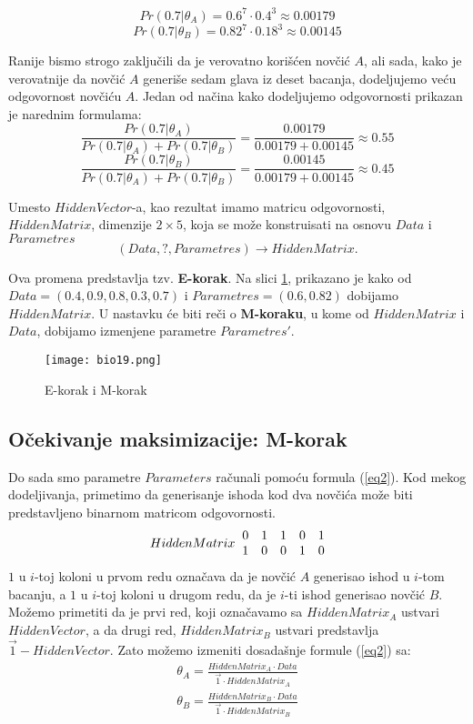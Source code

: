 $$Pr(0.7|\theta_A) = 0.6^7 \cdot 0.4^3 \approx 0.00179$$ 
$$Pr(0.7|\theta_B)= 0.82^7 \cdot 0.18^3 \approx 0.00145$$

Ranije bismo strogo zaključili da je verovatno korišćen novčić $A$, ali sada, kako je verovatnije da novčić $A$ generiše sedam glava iz deset bacanja, dodeljujemo veću odgovornost novčiću $A$. %
Jedan od načina kako dodeljujemo odgovornosti prikazan je narednim formulama:
$$\frac{Pr(0.7|\theta_A)}{Pr(0.7|\theta_A) + Pr(0.7|\theta_B)} = \frac{0.00179}{0.00179 + 0.00145} \approx 0.55 $$
$$\frac{Pr(0.7|\theta_B)}{Pr(0.7|\theta_A) + Pr(0.7|\theta_B)} = \frac{0.00145}{0.00179 + 0.00145} \approx 0.45 $$

Umesto $HiddenVector$-a, kao rezultat imamo matricu odgovornosti, $HiddenMatrix$, dimenzije $2 \times 5$, %
koja se može konstruisati na osnovu $Data$ i $Parametres$
$$(Data, ? ,Parametres) \rightarrow HiddenMatrix.$$

Ova promena predstavlja tzv. \textbf{E-korak}. Na slici \ref{slika 19}, prikazano je kako od $Data = (0.4, 0.9, 0.8, 0.3, 0.7)$ i $Parametres = (0.6, 0.82)$ dobijamo $HiddenMatrix$. U nastavku će biti reči o \textbf{M-koraku}, u kome od $HiddenMatrix$ i $Data$, dobijamo izmenjene parametre $Parametres'$.
\begin{figure}
    \centering
    \texttt{[image: bio19.png]}
    \caption{E-korak i M-korak}
    \label{slika 19}
\end{figure}

\subsection{Očekivanje maksimizacije: M-korak}

Do sada smo parametre $Parameters$ računali pomoću formula (\ref{eq2}). Kod mekog dodeljivanja, primetimo da generisanje ishoda kod dva novčića može biti predstavljeno binarnom matricom odgovornosti.
$$HiddenMatrix \hspace{0.2cm}
\begin{matrix}
0 & 1 & 1 & 0 & 1 \\
1 & 0 & 0 & 1 & 0
\end{matrix}
$$
$1$ u $i$-toj koloni u prvom redu označava da je novčić $A$ generisao ishod u $i$-tom bacanju, a $1$ u $i$-toj koloni u drugom redu, da je $i$-ti ishod generisao novčić $B$.
Možemo primetiti da je prvi red, koji označavamo sa $HiddenMatrix_A$ ustvari $HiddenVector$, a da drugi red, $HiddenMatrix_B$ ustvari predstavlja $\overrightarrow{1} - HiddenVector$. Zato možemo izmeniti dosadašnje formule (\ref{eq2}) sa:
\begin{equation}
\label{eq3}
\begin{split}
\theta_A = \frac{HiddenMatrix_A \cdot Data}{\overrightarrow{1} \cdot HiddenMatrix_A}\\
\theta_B =\frac{HiddenMatrix_B \cdot Data}{\overrightarrow{1} \cdot HiddenMatrix_B}
\end{split}
\end{equation}
	
